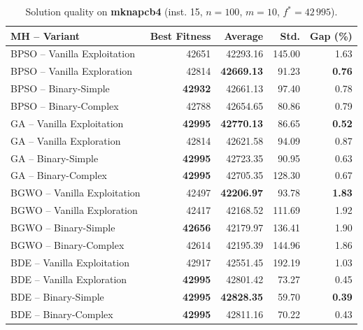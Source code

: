 \documentclass[journal,article,submit,moreauthors]{Definitions/mdpi}
\begin{document}
\begin{table}[htbp]
  \centering
  \small
  \caption{Solution quality on \textbf{mknapcb4} (inst. 15, $n=100$, $m=10$, $f^*=42\,995$).}
  \label{tab:calidad_mknapcb4_15}
  \begin{tabular}{lrrrr}
    \toprule
    \textbf{MH -- Variant} &
    \textbf{Best Fitness} &
    \textbf{Average} &
    \textbf{Std.} &
    \textbf{Gap (\%)} \\
    \midrule
    BPSO -- Vanilla Exploitation &          42651 &         42293.16 & 145.00 &         1.63 \\
    BPSO -- Vanilla Exploration  &          42814 & \textbf{42669.13} &  91.23 & \textbf{0.76} \\
    BPSO -- Binary-Simple        & \textbf{42932} &         42661.13 &  97.40 &         0.78 \\
    BPSO -- Binary-Complex       &          42788 &         42654.65 &  80.86 &         0.79 \\
    \midrule
    GA -- Vanilla Exploitation   & \textbf{42995} & \textbf{42770.13} &  86.65 & \textbf{0.52} \\
    GA -- Vanilla Exploration    &          42814 &         42621.58 &  94.09 &         0.87 \\
    GA -- Binary-Simple          & \textbf{42995} &         42723.35 &  90.95 &         0.63 \\
    GA -- Binary-Complex         & \textbf{42995} &         42705.35 & 128.30 &         0.67 \\
    \midrule
    BGWO -- Vanilla Exploitation &          42497 & \textbf{42206.97} &  93.78 & \textbf{1.83} \\
    BGWO -- Vanilla Exploration  &          42417 &         42168.52 & 111.69 &         1.92 \\
    BGWO -- Binary-Simple        & \textbf{42656} &         42179.97 & 136.41 &         1.90 \\
    BGWO -- Binary-Complex       &          42614 &         42195.39 & 144.96 &         1.86 \\
    \midrule
    BDE -- Vanilla Exploitation  &          42917 &         42551.45 & 192.19 &         1.03 \\
    BDE -- Vanilla Exploration   & \textbf{42995} &         42801.42 &  73.27 &         0.45 \\
    BDE -- Binary-Simple         & \textbf{42995} & \textbf{42828.35} &  59.70 & \textbf{0.39} \\
    BDE -- Binary-Complex        & \textbf{42995} &         42811.16 &  70.22 &         0.43 \\
    \bottomrule
  \end{tabular}
\end{table}
\end{document}

